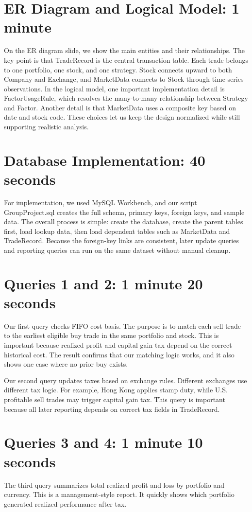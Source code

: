 \documentclass[11pt]{article}
\begin{document}
\section*{ER Diagram and Logical Model: 1 minute}
On the ER diagram slide, we show the main entities and their relationships. The key point is that TradeRecord is the central transaction table. Each trade belongs to one portfolio, one stock, and one strategy. Stock connects upward to both Company and Exchange, and MarketData connects to Stock through time-series observations. In the logical model, one important implementation detail is FactorUsageRule, which resolves the many-to-many relationship between Strategy and Factor. Another detail is that MarketData uses a composite key based on date and stock code. These choices let us keep the design normalized while still supporting realistic analysis.

\section*{Database Implementation: 40 seconds}
For implementation, we used MySQL Workbench, and our script GroupProject.sql creates the full schema, primary keys, foreign keys, and sample data. The overall process is simple: create the database, create the parent tables first, load lookup data, then load dependent tables such as MarketData and TradeRecord. Because the foreign-key links are consistent, later update queries and reporting queries can run on the same dataset without manual cleanup.

\section*{Queries 1 and 2: 1 minute 20 seconds}
Our first query checks FIFO cost basis. The purpose is to match each sell trade to the earliest eligible buy trade in the same portfolio and stock. This is important because realized profit and capital gain tax depend on the correct historical cost. The result confirms that our matching logic works, and it also shows one case where no prior buy exists.

Our second query updates taxes based on exchange rules. Different exchanges use different tax logic. For example, Hong Kong applies stamp duty, while U.S. profitable sell trades may trigger capital gain tax. This query is important because all later reporting depends on correct tax fields in TradeRecord.

\section*{Queries 3 and 4: 1 minute 10 seconds}
The third query summarizes total realized profit and loss by portfolio and currency. This is a management-style report. It quickly shows which portfolio generated realized performance after tax.
\end{document}
